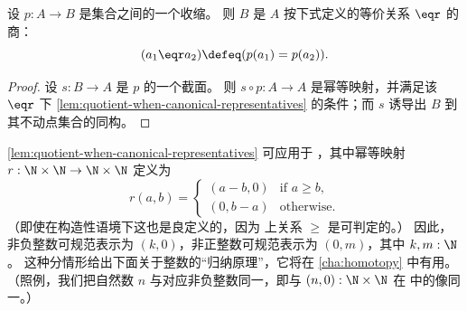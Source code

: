 \begin{cor}\label{thm:retraction-quotient}
  设 $p:A\to B$ 是集合之间的一个收缩。
  则 $B$ 是 $A$ 按下式定义的等价关系 $\eqr$ 的商：
  \[ (a_1 \eqr a_2) \defeq (p(a_1) = p(a_2)). \]
\end{cor}
\begin{proof}
  设 $s:B\to A$ 是 $p$ 的一个截面。
  则 $s\circ p : A\to A$ 是幂等映射，并满足该 $\eqr$ 下 \cref{lem:quotient-when-canonical-representatives} 的条件；而 $s$ 诱导出 $B$ 到其不动点集合的同构。
\end{proof}

\begin{rmk}\label{Z-quotient-by-canonical-representatives}
\cref{lem:quotient-when-canonical-representatives} 可应用于 \Z，其中幂等映射 $r : \N \times \N \to \N \times \N$
定义为
%
\begin{equation*}
  r(a, b) =
  \begin{cases}
    (a - b, 0) & \text{if $a \geq b$,} \\
    (0, b - a) & \text{otherwise.}
  \end{cases}
\end{equation*}
%
（即使在构造性语境下这也是良定义的，因为 \N 上关系 $\geq$ 是可判定的。）
因此，非负整数可规范表示为 $(k, 0)$，非正整数可规范表示为 $(0, m)$，其中 $k,m:\N$。
这种分情形给出下面关于整数的“归纳原理”，它将在 \cref{cha:homotopy} 中有用。
%
（照例，我们把自然数 $n$ 与对应非负整数同一，即与 $(n,0):\N\times\N$ 在 \Z 中的像同一。）
\end{rmk}


